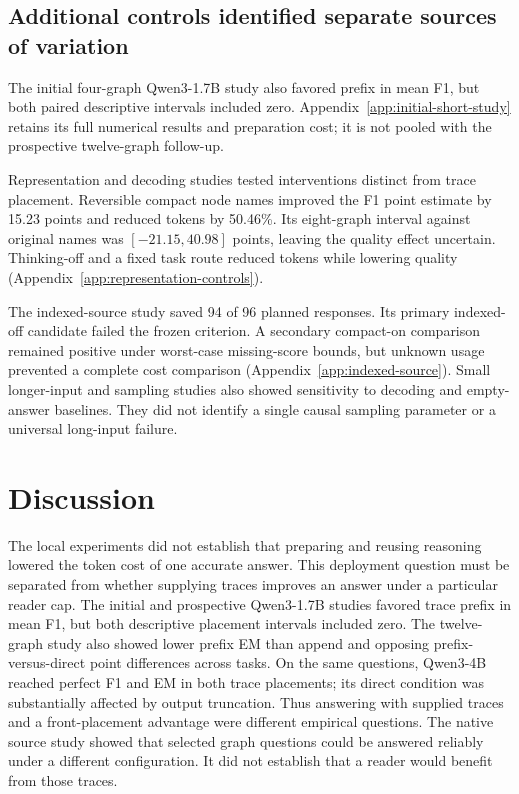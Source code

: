 \subsection{Additional controls identified separate sources of variation}
The initial four-graph Qwen3-1.7B study also favored prefix in mean F1, but both paired descriptive intervals included zero. Appendix~\ref{app:initial-short-study} retains its full numerical results and preparation cost; it is not pooled with the prospective twelve-graph follow-up.

Representation and decoding studies tested interventions distinct from trace placement. Reversible compact node names improved the F1 point estimate by 15.23 points and reduced tokens by 50.46\%. Its eight-graph interval against original names was $[-21.15,40.98]$ points, leaving the quality effect uncertain. Thinking-off and a fixed task route reduced tokens while lowering quality (Appendix~\ref{app:representation-controls}).

The indexed-source study saved 94 of 96 planned responses. Its primary indexed-off candidate failed the frozen criterion. A secondary compact-on comparison remained positive under worst-case missing-score bounds, but unknown usage prevented a complete cost comparison (Appendix~\ref{app:indexed-source}). Small longer-input and sampling studies also showed sensitivity to decoding and empty-answer baselines. They did not identify a single causal sampling parameter or a universal long-input failure.

\section{Discussion}
The local experiments did not establish that preparing and reusing reasoning lowered the token cost of one accurate answer. This deployment question must be separated from whether supplying traces improves an answer under a particular reader cap. The initial and prospective Qwen3-1.7B studies favored trace prefix in mean F1, but both descriptive placement intervals included zero. The twelve-graph study also showed lower prefix EM than append and opposing prefix-versus-direct point differences across tasks. On the same questions, Qwen3-4B reached perfect F1 and EM in both trace placements; its direct condition was substantially affected by output truncation. Thus answering with supplied traces and a front-placement advantage were different empirical questions. The native source study showed that selected graph questions could be answered reliably under a different configuration. It did not establish that a reader would benefit from those traces.

